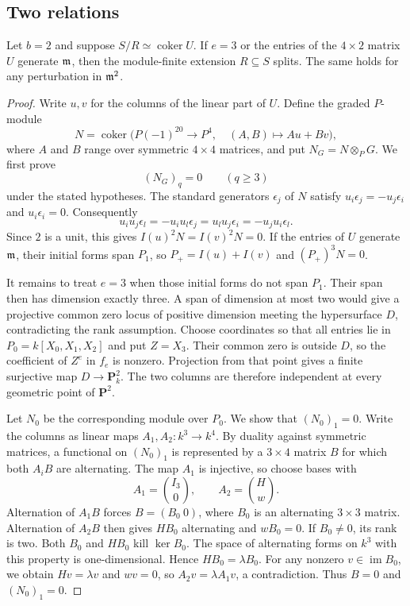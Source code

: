 \subsection{Two relations}
\begin{theorem}\label{hyp-two}
Let $b=2$ and suppose $S/R\simeq\operatorname{coker}U$. If $e=3$ or the entries of the $4\times2$ matrix $U$ generate $\mathfrak m$, then the module-finite extension $R\subseteq S$ splits. The same holds for any perturbation in $\mathfrak m^2$.
\end{theorem}
\begin{proof}
Write $u,v$ for the columns of the linear part of $U$.
Define the graded $P$-module
\[
 N=\operatorname{coker}\bigl(
 P(-1)^{20}\longrightarrow P^4,\quad
 (A,B)\longmapsto Au+Bv\bigr),
\]
where $A$ and $B$ range over symmetric $4\times4$ matrices, and put
$N_G=N\otimes_PG$.
We first prove
\begin{equation}\label{two-relation-vanishing}
 (N_G)_q=0\qquad(q\ge3)
\end{equation}
under the stated hypotheses.
The standard generators $\epsilon_j$ of $N$ satisfy
$u_i\epsilon_j=-u_j\epsilon_i$ and $u_i\epsilon_i=0$.
Consequently
\[
 u_iu_j\epsilon_l=-u_i u_l\epsilon_j=u_lu_j\epsilon_i=-u_ju_i\epsilon_l.
\]
Since $2$ is a unit, this gives
$I(u)^2N=I(v)^2N=0$.
If the entries of $U$ generate $\mathfrak m$, their initial forms span $P_1$, so $P_+=I(u)+I(v)$ and $(P_+)^3N=0$.

It remains to treat $e=3$ when those initial forms do not span $P_1$.
Their span then has dimension exactly three. A span of dimension at
most two would give a projective common zero locus of positive
dimension meeting the hypersurface $D$, contradicting the rank
assumption.
Choose coordinates so that all entries lie in
$P_0=k[X_0,X_1,X_2]$ and put $Z=X_3$.
Their common zero is outside $D$, so the coefficient of $Z^e$ in
$f_e$ is nonzero.  Projection from that point gives a finite surjective
map $D\to\mathbf P^2_k$.
The two columns are therefore independent at every geometric point of
$\mathbf P^2$.

Let $N_0$ be the corresponding module over $P_0$.
We show that $(N_0)_1=0$.
Write the columns as linear maps $A_1,A_2:k^3\to k^4$.
By duality against symmetric matrices, a functional on $(N_0)_1$
is represented by a $3\times4$ matrix $B$ for which both $A_iB$
are alternating.
The map $A_1$ is injective, so choose bases with
\[
 A_1=\binom{I_3}{0},\qquad A_2=\binom{H}{w}.
\]
Alternation of $A_1B$ forces $B=(B_0\ 0)$, where $B_0$ is an
alternating $3\times3$ matrix.
Alternation of $A_2B$ then gives $HB_0$ alternating and $wB_0=0$.
If $B_0\ne0$, its rank is two.
Both $B_0$ and $HB_0$ kill $\ker B_0$. The space of alternating
forms on $k^3$ with this property is one-dimensional.
Hence $HB_0=\lambda B_0$.
For any nonzero $v\in\operatorname{im}B_0$, we obtain
$Hv=\lambda v$ and $wv=0$, so $A_2v=\lambda A_1v$, a contradiction.
Thus $B=0$ and $(N_0)_1=0$.


\end{proof}
